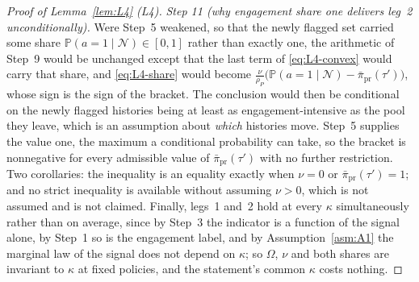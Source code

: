 \documentclass[11pt]{article}
\newcommand{\Prb}{\mathbb{P}}
\begin{document}
\begin{proof}[Proof of Lemma~\ref{lem:L4} (L4)]
\emph{Step 11 (why engagement share one delivers leg~2 unconditionally).} Were Step~5 weakened, so
that the newly flagged set carried some share $\Prb(a=1\mid\mathcal N) \in [0,1]$ rather than exactly
one, the arithmetic of Step~9 would be unchanged except that the last term of \eqref{eq:L4-convex}
would carry that share, and \eqref{eq:L4-share} would become
$\tfrac{\nu}{\rho_P}\bigl(\Prb(a=1\mid\mathcal N)-\bar\pi_{\mathrm{pr}}(\tau')\bigr)$, whose sign is
the sign of the bracket. The conclusion would then be conditional on the newly flagged histories
being at least as engagement-intensive as the pool they leave, which is an assumption about
\emph{which} histories move. Step~5 supplies the value one, the maximum a conditional probability can
take, so the bracket is nonnegative for every admissible value of $\bar\pi_{\mathrm{pr}}(\tau')$ with
no further restriction. Two corollaries: the inequality is an equality exactly when $\nu = 0$ or
$\bar\pi_{\mathrm{pr}}(\tau') = 1$; and no strict inequality is available without assuming
$\nu > 0$, which is not assumed and is not claimed. Finally, legs~1 and~2 hold at every $\kappa$
simultaneously rather than on average, since by Step~3 the indicator is a function of the signal
alone, by Step~1 so is the engagement label, and by Assumption~\ref{asm:A1} the marginal law of the
signal does not depend on $\kappa$; so $\Omega$, $\nu$ and both shares are invariant to $\kappa$ at
fixed policies, and the statement's common $\kappa$ costs nothing.


\end{proof}
\end{document}

